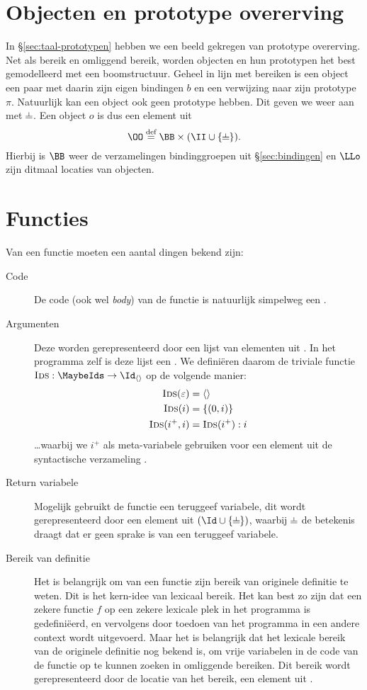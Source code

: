 \section{Objecten en prototype overerving}
\label{sec:sem-objecten}

In §\ref{sec:taal-prototypen} hebben we een beeld gekregen van prototype overerving. Net als bereik en omliggend bereik, worden objecten en hun prototypen het best gemodelleerd met een boomstructuur. Geheel in lijn met bereiken is een object een paar met daarin zijn eigen bindingen $b$ en een verwijzing naar zijn prototype $\pi$. Natuurlijk kan een object ook geen prototype hebben. Dit geven we weer aan met $\nil$. Een object $o$ is dus een element uit
%
\begin{equation*}
  \OO \DEF \BB \times (\II \cup \{\nil\}).
\end{equation*}
%
Hierbij is $\BB$ weer de verzamelingen bindinggroepen uit §\ref{sec:bindingen} en $\LLo$ zijn ditmaal locaties van objecten.

\section{Functies}
\label{sec:functies}

Van een functie moeten een aantal dingen bekend zijn:
\begin{description}
  \item[Code] De code (ook wel \emph{body}) van de functie is natuurlijk simpelweg een \Stm.
  \item[Argumenten] Deze worden gerepresenteerd door een lijst van elementen uit \Id. In het programma zelf is deze lijst een \MaybeIds. We definiëren daarom de triviale functie $\textsc{Ids} : \MaybeIds \to \Id_{\langle\rangle}$ op de volgende manier:
  \begin{align*}
    \textsc{Ids}(\varepsilon) &= \langle\rangle \\
    \textsc{Ids}(i) &= \{(0, i)\} \\
    \textsc{Ids}(i^+, i) &= \textsc{Ids}(i^+) : i
  \end{align*}
  \dots waarbij we $i^+$ als meta-variabele gebruiken voor een element uit de syntactische verzameling \Ids.
  \item[Return variabele] Mogelijk gebruikt de functie een teruggeef variabele, dit wordt gerepresenteerd door een element uit $(\Id \cup \{\nil\})$, waarbij $\nil$ de betekenis draagt dat er geen sprake is van een teruggeef variabele.
  \item[Bereik van definitie] Het is belangrijk om van een functie zijn bereik van originele definitie te weten. Dit is het kern-idee van lexicaal bereik. Het kan best zo zijn dat een zekere functie $f$ op een zekere lexicale plek in het programma is gedefiniëerd, en vervolgens door toedoen van het programma in een andere context wordt uitgevoerd. Maar het is belangrijk dat het lexicale bereik van de originele definitie nog bekend is, om vrije variabelen in de code van de functie op te kunnen zoeken in omliggende bereiken. Dit bereik wordt gerepresenteerd door de locatie van het bereik, een element uit \II.
\end{description}

